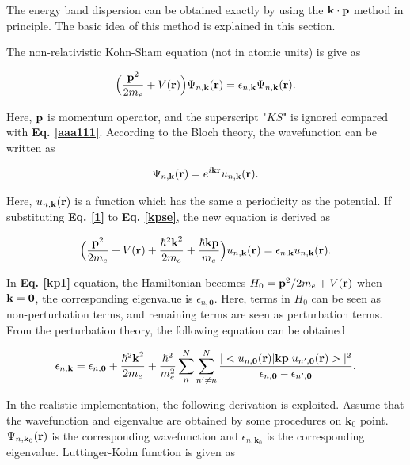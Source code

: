 \documentclass[a4paper, 12pt, titlepage,oneside,drop]{kthesis}
\begin{document}
The energy band dispersion can be obtained exactly by using the $\bold k \cdot \bold p$ method in principle. The basic idea of this method is explained in this section.

The non-relativistic Kohn-Sham equation (not in atomic units) is give as

\begin{equation}\label{kpse}
\Big( \frac {{\textbf p}^2} {2m_e} + V({\textbf r}) \Big) \wfbloch<n>< \bold k> = \epsilon_{n,\textbf{k}} \wfbloch<n><\bold k>.
\end{equation}

Here, $\textbf p$ is momentum operator, and the superscript "$KS$" is ignored compared with \textbf{Eq. \ref{aaa111}}. According to the Bloch theory, the wavefunction can be written as

\begin{equation}\label{1}
 \wfbloch<n><\bold k> = \expg<k> \ubloch<n><\bold k>.
\end{equation}

Here, $\ubloch<n><\bold k>$ is a function which has the same a periodicity as the potential. If substituting \textbf{Eq. \ref{1}} to \textbf{Eq. \ref{kpse}}, the new equation is derived as

\begin{equation}\label{kp1}
 \Big(  \frac{{\textbf p}^2}{2m_e} + V({\textbf r }) + \frac{{\hbar^2 {\textbf k}^2}}{2m_e} + \frac{{\hbar \textbf {kp}}}{m_e} \Big) \ubloch<n><\bold  k>  =  \epsilon_{n,\textbf{k}} \ubloch<n><\bold  k>.
\end{equation}

In \textbf{Eq. \ref{kp1}} equation, the Hamiltonian becomes $H_0 = {\textbf p}^2 / {2m_e} + V({\textbf r })$ when $\textbf k = \textbf 0$, the corresponding eigenvalue is $\epsilon_{n,\textbf{0}}$. 
Here, terms in $H_0$ can be seen as non-perturbation terms, and remaining terms are seen as perturbation terms. From the perturbation theory, the following equation can be obtained  

\begin{equation}
 \epsilon_{n,\textbf{k}} =  \epsilon_{n,\textbf{0}} + \frac{{\hbar^2 {\textbf k}^2}}{2m_e} + \frac{ \hbar^2}{m_{e}^2} \sum\limits_n^{N} \sum\limits_{n' \neq n}^{N} \frac{|<\ubloch<n><\bold 0>|{\textbf {kp}}|\ubloch<n'><\bold  0>>|^2}{\epsilon_{n,\textbf 0} - \epsilon_{n',\textbf 0}}.
\end{equation}

In the realistic implementation, the following derivation is exploited. Assume that the wavefunction and eigenvalue are obtained by some procedures on $\textbf{k}_0$ point. $\wfbloch<n><\bold{k}_0>$ is the corresponding wavefunction
and $\epsilon_{n,\textbf{k}_0}$ is the corresponding eigenvalue. Luttinger-Kohn function is given as
\end{document}
